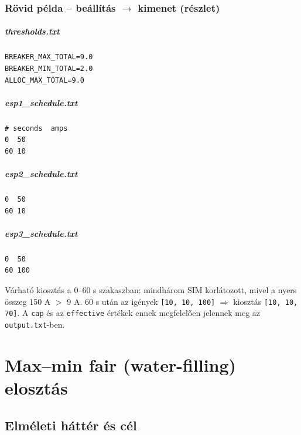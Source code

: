 \subsection{Rövid példa -- beállítás $\rightarrow$ kimenet (részlet)}

\paragraph{thresholds.txt}
\begin{verbatim}
BREAKER_MAX_TOTAL=9.0
BREAKER_MIN_TOTAL=2.0
ALLOC_MAX_TOTAL=9.0
\end{verbatim}

\paragraph{esp1\_schedule.txt}
\begin{verbatim}
# seconds  amps
0  50
60 10
\end{verbatim}

\paragraph{esp2\_schedule.txt}
\begin{verbatim}
0  50
60 10
\end{verbatim}

\paragraph{esp3\_schedule.txt}
\begin{verbatim}
0  50
60 100
\end{verbatim}

\noindent Várható kiosztás a 0--60 s szakaszban: mindhárom SIM korlátozott, 
mivel a nyers összeg 150 A $>$ 9 A. 60 s után az 
igények \texttt{[10, 10, 100]} $\Rightarrow$ kiosztás \texttt{[10, 10, 70]}. A \texttt{cap} és 
az \texttt{effective} értékek ennek megfelelően jelennek meg az \texttt{output.txt}-ben.

\chapter{Max--min fair (water-filling) elosztás}

\section{Elméleti háttér és cél}

